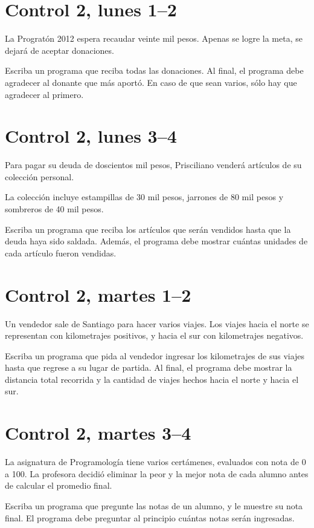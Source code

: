 \documentclass[12pt,spanish,a5paper,landscape]{article}
\newcommand\nc{2}
\begin{document}
  \pagestyle{empty}
  \thispagestyle{empty}

  \part*{Control \nc, lunes 1--2}
  \newpage

  La Progratón 2012 espera recaudar veinte mil pesos.
  Apenas se logre la meta,
  se dejará de aceptar donaciones.

  Escriba un programa que reciba todas las donaciones.
  Al final,
  el programa debe agradecer
  al donante que más aportó.
  En caso de que sean varios,
  sólo hay que agradecer al primero.

  

  \newpage
  \part*{Control \nc, lunes 3--4}
  \newpage

  Para pagar su deuda de doscientos mil pesos,
  Prisciliano venderá artículos de su colección personal.

  La colección incluye
  estampillas de 30 mil pesos,
  jarrones de 80 mil pesos y
  sombreros de 40 mil pesos.

  Escriba un programa
  que reciba los artículos que serán vendidos
  hasta que la deuda haya sido saldada.
  Además,
  el programa debe mostrar
  cuántas unidades de cada artículo
  fueron vendidas.

  

  \newpage
  \part*{Control \nc, martes 1--2}
  \newpage

  Un vendedor sale de Santiago
  para hacer varios viajes.
  Los viajes hacia el norte
  se representan con kilometrajes positivos,
  y hacia el sur con kilometrajes negativos.

  Escriba un programa que pida al vendedor
  ingresar los kilometrajes de sus via\-jes
  hasta que regrese a su lugar de partida.
  Al final,
  el programa debe mostrar
  la distancia total recorrida
  y la cantidad de viajes hechos
  hacia el norte y hacia el sur.

  

  \newpage
  \part*{Control \nc, martes 3--4}
  \newpage

  La asignatura de Programología
  tiene varios certámenes,
  evaluados con nota de 0 a 100.
  La profesora decidió eliminar
  la peor y la mejor nota de cada alumno
  antes de calcular el promedio final.

  Escriba un programa que pregunte
  las notas de un alumno,
  y le muestre su nota final.
  El programa debe preguntar al principio
  cuántas notas serán ingresadas.

  
\end{document}
